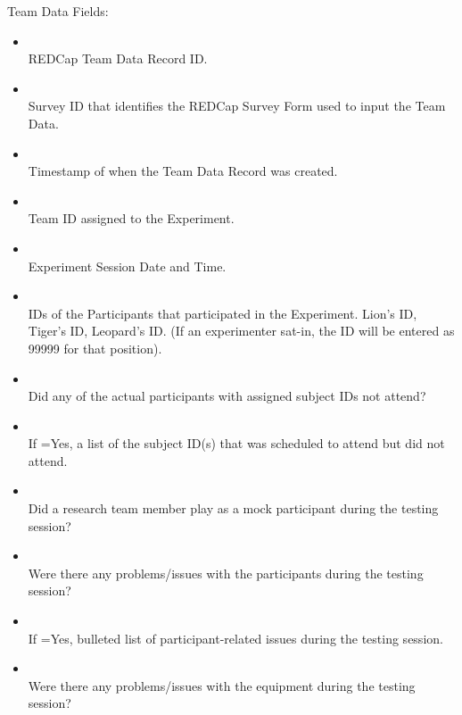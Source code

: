 \begin{description}
Team Data Fields:
\begin{itemize}
    \item {}\\REDCap Team Data Record ID.
    \item {}\\Survey ID that identifies the REDCap Survey Form used to input the Team Data.
    \item {}\\Timestamp of when the Team Data Record was created.
    \item {}\\Team ID assigned to the Experiment.
    \item {}\\Experiment Session Date and Time.
    \item {}\\IDs of the Participants that participated in the Experiment. Lion's ID, Tiger's ID, Leopard's ID. (If an experimenter sat-in, the ID will be entered as 99999 for that position).
    \item {}\\Did any of the actual participants with assigned subject IDs not attend?
    \item {}\\If {}=Yes, a list of the subject ID(s) that was scheduled to attend but did not attend.
    \item {}\\Did a research team member play as a mock participant during the testing session?
    \item {}\\Were there any problems/issues with the participants during the testing session?
    \item {}\\If {}=Yes, bulleted list of participant-related issues during the testing session.
    \item {}\\Were there any problems/issues with the equipment during the testing session?

\end{itemize}
\end{description}
